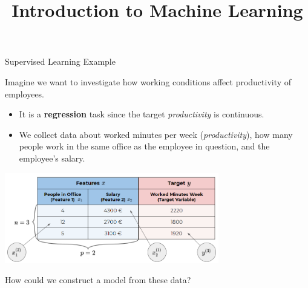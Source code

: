 \documentclass[11pt,compress,t,notes=noshow, xcolor=table]{beamer}
\title{Introduction to Machine Learning}
\institute{\href{https://compstat-lmu.github.io/lecture_i2ml/}{compstat-lmu.github.io/lecture\_i2ml}}
\date{}
\begin{document}












\begin{vbframe}{Supervised Learning Example}

Imagine we want to investigate how working conditions affect productivity of employees.

\begin{itemize}
	\item It is a \textbf{regression} task since the target \emph{productivity} is continuous.
	\item We collect data about worked minutes 
per week (\emph{productivity}), how many people work in the same office as the 
employee in question, and the employee's salary.
\end{itemize}
  
\begin{center}
  \includegraphics[width = 0.7\textwidth]{figure_man/data_table} 
\end{center}

\framebreak

How could we construct a model from these data?\\[1ex]


\end{vbframe}
\end{document}
